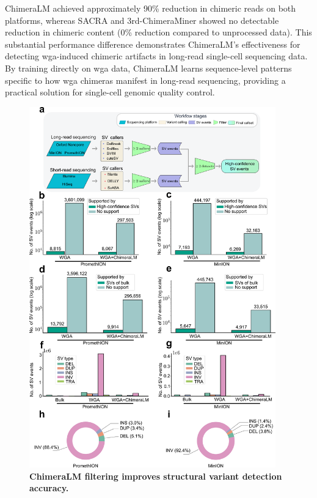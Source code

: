 \documentclass[pdflatex,sn-nature,lineno]{sn-jnl}%
\theoremstyle{thmstyleone}%
\theoremstyle{thmstyletwo}%
\theoremstyle{thmstylethree}%
\begin{document}
ChimeraLM achieved approximately 90\% reduction in chimeric reads on both platforms, whereas SACRA and 3rd-ChimeraMiner showed no detectable reduction in chimeric content (0\% reduction compared to unprocessed data).
This substantial performance difference demonstrates ChimeraLM's effectiveness for detecting \gls{wga}-induced chimeric artifacts in long-read single-cell sequencing data.
By training directly on \gls{wga} data, ChimeraLM learns sequence-level patterns specific to how \gls{wga} chimeras manifest in long-read sequencing, providing a practical solution for single-cell genomic quality control.

\begin{figure}[H]
	\begin{center}
		\includegraphics[width=0.95\textwidth]{final_figures/figure3}
	\end{center}
	\caption{{\bf ChimeraLM filtering improves structural variant detection accuracy.}
}
\end{figure}
\end{document}
